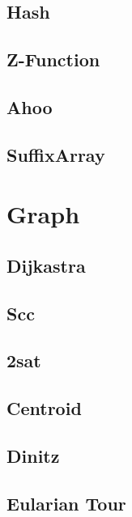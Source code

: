\subsection{Hash}
\raggedbottom
\subsection{Z-Function}
\raggedbottom
\subsection{Ahoo}
\raggedbottom
\subsection{SuffixArray}
\raggedbottom
\hrulefill



\section{Graph}
\subsection{Dijkastra}
\raggedbottom
\subsection{Scc}
\raggedbottom
\subsection{2sat}
\raggedbottom
\subsection{Centroid}
\raggedbottom
\subsection{Dinitz}
\raggedbottom
\subsection{Eularian Tour}
\raggedbottom
